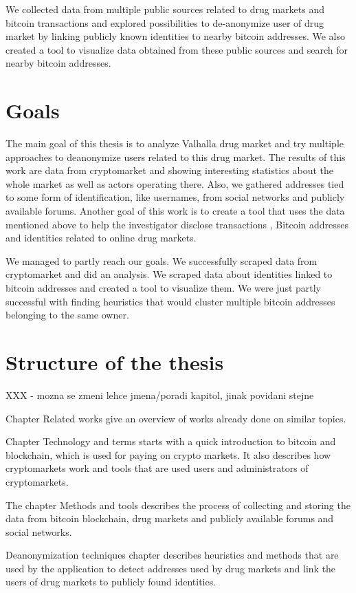 \documentclass[
  digital, %
  table,   %
  lof,     %
  lot,     %
  oneside
]{fithesis3}
\begin{document}
We collected data from multiple public sources related to drug markets and bitcoin transactions and explored
 possibilities to de-anonymize user of drug market by linking publicly known identities to nearby bitcoin addresses.
We also created a tool to visualize data obtained from these public sources and search for nearby bitcoin addresses.

\section{Goals}

The main goal of this thesis is to analyze Valhalla drug market
and try multiple approaches to deanonymize users related to this drug market.
The results of this work are data from cryptomarket and
 showing interesting statistics about the whole market as well as actors operating there.
 Also, we gathered addresses tied to some form of identification, like usernames, from social networks and publicly available forums.
Another goal of this work is to create a tool that uses the data mentioned above to help the investigator disclose transactions
, Bitcoin addresses and identities related to online drug markets.

We managed to partly reach our goals. We successfully scraped data from cryptomarket and did an analysis.
We scraped data about identities linked to bitcoin addresses and created a tool to visualize them.
We were just partly successful with finding heuristics that would cluster multiple bitcoin addresses belonging to the
same owner.

\section{Structure of the thesis}
XXX - mozna se zmeni lehce jmena/poradi kapitol, jinak povidani stejne

Chapter Related works give an overview of works already done on similar topics. 

Chapter Technology and terms starts with a quick introduction to bitcoin and blockchain,
which is used for paying on crypto markets.
It also describes how cryptomarkets work and tools that are used users and administrators of cryptomarkets.

The chapter Methods and tools describes the process of collecting and storing the data from bitcoin blockchain,
drug markets and publicly available forums and social networks. 

Deanonymization techniques chapter describes heuristics and methods that are used by the application to detect 
addresses used by drug markets and link the users of drug markets to publicly found identities.
\end{document}
